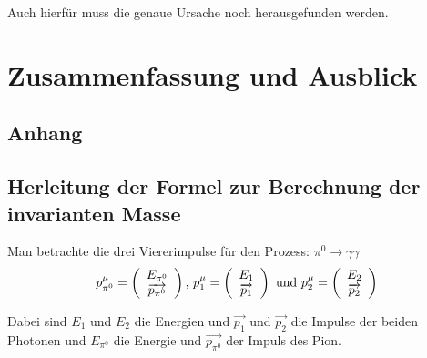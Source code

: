 \documentclass[a4paper,11pt,oneside,final,german,openbib,pdftex]{scrbook}
\begin{document}
{Auch hierf\"ur muss die genaue Ursache noch herausgefunden werden.


\chapter{Zusammenfassung und Ausblick}


\begin{appendix}
\chapter{Anhang}
\section{Herleitung der Formel zur Berechnung der invarianten Masse}
\label{sec:Herleitung-der-Formel-zur-Berechnung-der-invarianten-Masse}

Man betrachte die drei Viererimpulse f\"ur den Prozess: $\pi^0\rightarrow \gamma\gamma $
\begin{equation}
p_{\pi^0}^{\mu}=\left(\begin{array}{c}E_{\pi^0}\\\overrightarrow{p_{\pi^0}}\end{array}\right) \textnormal{,  }
p_{1}^{\mu}=\left(\begin{array}{c}E_{1}\\\overrightarrow{p_{1}}\end{array}\right) \textnormal{ und  } p_{2}^{\mu}=\left(\begin{array}{c}E_{2}\\\overrightarrow{p_{2}}\end{array}\right)
\end{equation}

Dabei sind $E_{1}$ und $E_{2}$ die Energien und $\overrightarrow{p_{1}}$ und $\overrightarrow{p_{2}}$ die Impulse der beiden Photonen und $E_{\pi^0}$ die Energie und $\overrightarrow{p_{\pi^0}}$ der Impuls des Pion.


\end{appendix}}
\end{document}
